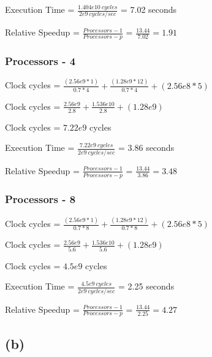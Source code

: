 \documentclass{article}
\begin{document}
    Execution Time = $\frac{1.404e10\ cycles}{2e9\ cycles/sec}$ = 7.02 seconds
    \vspace*{6pt}

    Relative Speedup = $\frac{Processors - 1}{Processors - p}$ = $\frac{13.44}{7.02} = 1.91 $

    \subsubsection*{Processors - 4}

    Clock cycles = $\frac{(2.56e9 * 1)}{0.7 * 4} + \frac{(1.28e9 * 12)}{0.7*4} + (2.56e8 * 5)$

    \vspace*{6pt}

    Clock cycles = $\frac{2.56e9}{2.8} + \frac{1.536e{10}}{2.8} + (1.28e9) $
    
    \vspace*{6pt}

    Clock cycles = $7.22e9$ cycles
    \vspace*{6pt}
    
    Execution Time = $\frac{7.22e9\ cycles}{2e9\ cycles/sec}$ = 3.86 seconds
    \vspace*{6pt}

    Relative Speedup = $\frac{Processors - 1}{Processors - p}$ = $\frac{13.44}{3.86} = 3.48$

    \subsubsection*{Processors - 8}

    Clock cycles = $\frac{(2.56e9 * 1)}{0.7 * 8} + \frac{(1.28e9 * 12)}{0.7*8} + (2.56e8 * 5)$

    \vspace*{6pt}

    Clock cycles = $\frac{2.56e9}{5.6} + \frac{1.536e{10}}{5.6} + (1.28e9) $
    
    \vspace*{6pt}

    Clock cycles = $4.5e9$ cycles
    \vspace*{6pt}
    
    Execution Time = $\frac{4.5e9\ cycles}{2e9\ cycles/sec}$ = 2.25 seconds
    \vspace*{6pt}

    Relative Speedup = $\frac{Processors - 1}{Processors - p}$ = $\frac{13.44}{2.25} = 4.27 $

    \subsection*{(b)}
\end{document}
